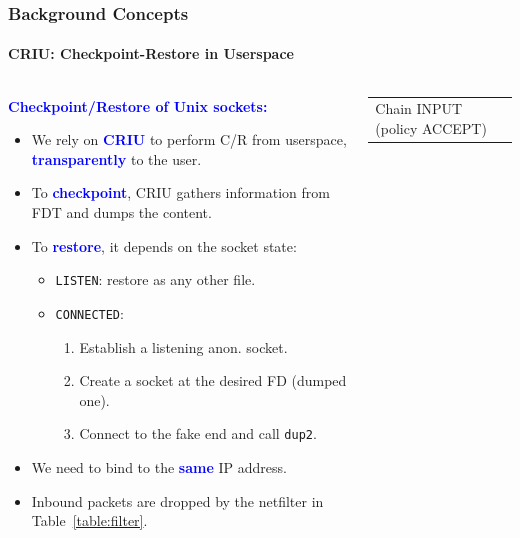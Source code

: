 \documentclass[9pt,    %
    english,            %
    xcolor=table,       %
    envcountsect,        %
    aspectratio=169     %
]{beamer}
\begin{document}
\begin{frame}
    \frametitle{Background Concepts}
    \framesubtitle{\textsc{CRIU}: Checkpoint-Restore in Userspace}

    \begin{columns}[t]
        \begin{column}{.65\textwidth}
            \textbf{\textcolor{blue}{Checkpoint/Restore of Unix sockets:}} 
            \begin{itemize}
                \item We rely on \textbf{\textcolor{blue}{CRIU}} to perform C/R from userspace, \textbf{\textcolor{blue}{transparently}} to the user.
                \item To \textbf{\textcolor{blue}{checkpoint}}, CRIU gathers information from FDT and dumps the content.
                \item To \textbf{\textcolor{blue}{restore}}, it depends on the socket state:
                \begin{itemize}
                    \item \texttt{LISTEN}: restore as any other file.
                    \item \texttt{CONNECTED}:
                    \begin{enumerate}
                        \item Establish a listening anon. socket.
                        \item Create a socket at the desired FD (dumped one).
                        \item Connect to the fake end and call \texttt{dup2}.
                    \end{enumerate}
                \end{itemize}
            \item We need to bind to the \textbf{\textcolor{blue}{same}} IP address.
            \item Inbound packets are dropped by the netfilter in Table~\ref{table:filter}.
            \end{itemize}
        \end{column}
        \begin{column}{.40\textwidth}
            \vspace{-18pt}
            \begin{table}
                \centering
                {\ttfamily \scriptsize
                \begin{tabular}{p{0.7cm}p{0.3cm}p{0.3cm}p{0.5cm}p{0.5cm}p{1.2cm}}
                    \multicolumn{6}{l}{Chain INPUT (policy ACCEPT)} \\

\end{tabular}}
\end{table}
\end{column}
\end{columns}
\end{frame}
\end{document}
